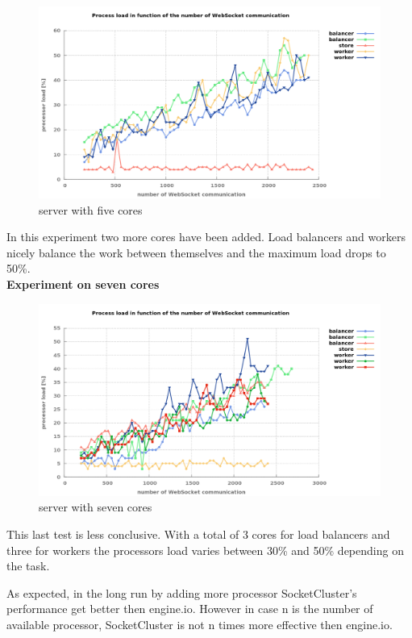 \begin{figure}[H]
	\centering
		\includegraphics[width=.9\textwidth]{./Figures/WS_server_2rising.png}
	\caption[WebSocket server on five cores]{server with five cores}
	\label{fig:WS_server_2rising}
\end{figure}

In this experiment two more cores have been added. Load balancers and
workers nicely balance the work between themselves and the maximum load drops to 50\%.\\

\textbf{Experiment on seven cores}

\begin{figure}[H]
	\centering
		\includegraphics[width=\textwidth]{./Figures/WS_server_3rising.png}
	\caption[WebSocket server on seven cores]{server with seven cores}
	\label{fig:WS_server_3rising}
\end{figure}

This last test is less conclusive. With a total of 3 cores for load balancers
and three for workers the processors load varies between 30\% and 50\%
depending on the task.

As expected, in the long run by adding more processor SocketCluster's
performance get better then engine.io. However in case n is the number of
available processor, SocketCluster is not n times more effective then
engine.io.


